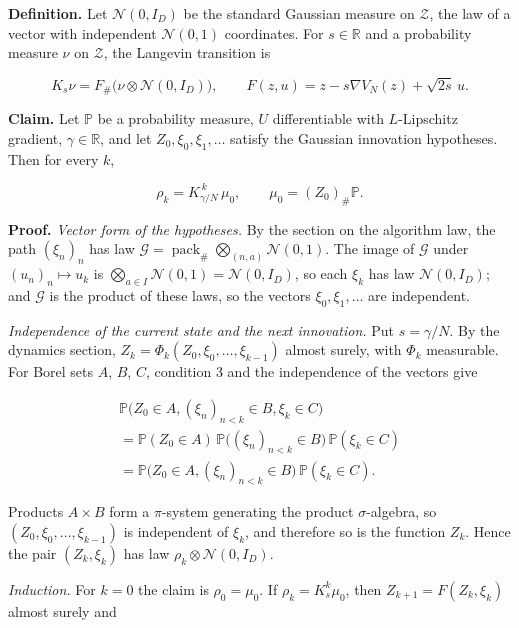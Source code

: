 \documentclass[11pt,a4paper]{report}
\begin{document}
\textbf{Definition.} Let \(\mathcal N(0,I_D)\) be the standard Gaussian measure on \(\mathcal Z\), the law of a vector with independent \(\mathcal N(0,1)\) coordinates. For \(s\in\mathbb R\) and a probability measure \(\nu\) on \(\mathcal Z\), the Langevin transition is


\[K_s\nu=F_\#\bigl(\nu\otimes\mathcal N(0,I_D)\bigr),\qquad F(z,u)=z-s\nabla V_N(z)+\sqrt{2s}\,u .\]


\textbf{Claim.} Let \(\mathbb P\) be a probability measure, \(U\) differentiable with \(L\)-Lipschitz gradient, \(\gamma\in\mathbb R\), and let \(Z_0,\xi_0,\xi_1,\dots\) satisfy the Gaussian innovation hypotheses. Then for every \(k\),


\[\rho_k=K_{\gamma/N}^{\,k}\,\mu_0,\qquad\mu_0=(Z_0)_\#\mathbb P .\]


\textbf{Proof.} \emph{Vector form of the hypotheses.} By the section on the algorithm law, the path \((\xi_n)_n\) has law \(\mathcal G=\operatorname{pack}_\#\bigotimes_{(n,a)}\mathcal N(0,1)\). The image of \(\mathcal G\) under \((u_n)_n\mapsto u_k\) is \(\bigotimes_{a\in I}\mathcal N(0,1)=\mathcal N(0,I_D)\), so each \(\xi_k\) has law \(\mathcal N(0,I_D)\); and \(\mathcal G\) is the product of these laws, so the vectors \(\xi_0,\xi_1,\dots\) are independent.




\emph{Independence of the current state and the next innovation.} Put \(s=\gamma/N\). By the dynamics section, \(Z_k=\Phi_k(Z_0,\xi_0,\dots,\xi_{k-1})\) almost surely, with \(\Phi_k\) measurable. For Borel sets \(A\), \(B\), \(C\), condition 3 and the independence of the vectors give


\[\begin{gathered}\mathbb P\bigl(Z_0\in A,(\xi_n)_{n<k}\in B,\xi_k\in C\bigr)\\=\mathbb P(Z_0\in A)\,\mathbb P\bigl((\xi_n)_{n<k}\in B\bigr)\,\mathbb P(\xi_k\in C)\\=\mathbb P\bigl(Z_0\in A,(\xi_n)_{n<k}\in B\bigr)\,\mathbb P(\xi_k\in C).\end{gathered}\]


Products \(A\times B\) form a \(\pi\)-system generating the product \(\sigma\)-algebra, so \((Z_0,\xi_0,\dots,\xi_{k-1})\) is independent of \(\xi_k\), and therefore so is the function \(Z_k\). Hence the pair \((Z_k,\xi_k)\) has law \(\rho_k\otimes\mathcal N(0,I_D)\).




\emph{Induction.} For \(k=0\) the claim is \(\rho_0=\mu_0\). If \(\rho_k=K_s^k\mu_0\), then \(Z_{k+1}=F(Z_k,\xi_k)\) almost surely and
\end{document}
